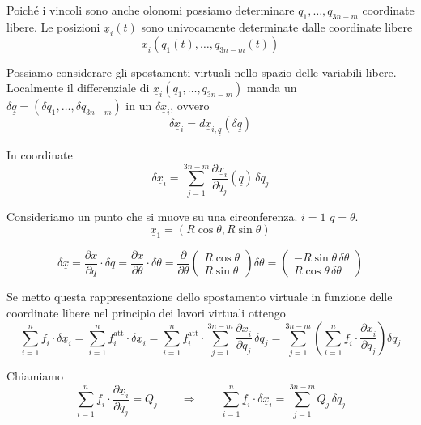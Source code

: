 Poiché i vincoli sono anche olonomi possiamo determinare \(q_1,\ldots,q_{3n-m}\) coordinate libere.
Le posizioni \(\underline{x}_i(t)\) sono univocamente determinate dalle coordinate libere
\[
\underline{x}_i(q_1(t),\ldots,q_{3n-m}(t))
\]

Possiamo considerare gli spostamenti virtuali nello spazio delle variabili libere.
Localmente il differenziale di \(\underline{x}_i(q_1,\ldots,q_{3n-m})\) manda un \(\delta \underline{q}=(\delta q_1,\ldots,\delta q_{3n-m})\) in un \(\delta \underline{x}_i\), ovvero
\[
\delta \underline{x}_i=d\underline{x}_{i,\underline{q}}(\delta \underline{q})
\]

In coordinate
\[
\delta \underline{x}_i=\sum_{j=1}^{3n-m}\frac{\partial \underline{x}_i}{\partial q_j}(\underline{q})\,\delta q_j
\]

\begin{example}{}
Consideriamo un punto che si muove su una circonferenza. \(i=1\) \(q=\theta\).
\[
\underline{x}_1=(R\cos\theta,R\sin\theta)
\]

\[
\delta \underline{x}=\frac{\partial \underline{x}}{\partial q}\cdot \delta q
=\frac{\partial \underline{x}}{\partial \theta}\cdot \delta \theta
=\frac{\partial}{\partial \theta}
\begin{pmatrix}
R\cos\theta\\
R\sin\theta
\end{pmatrix}
\delta \theta
=
\begin{pmatrix}
-R\sin\theta\,\delta \theta\\
R\cos\theta\,\delta \theta
\end{pmatrix}
\]
\end{example}

Se metto questa rappresentazione dello spostamento virtuale in funzione delle coordinate libere nel principio dei lavori virtuali ottengo
\[
\sum_{i=1}^{n}\underline{f}_i\cdot \delta \underline{x}_i
=
\sum_{i=1}^{n}\underline{f}_i^{\mathrm{att}}\cdot \delta \underline{x}_i
=
\sum_{i=1}^{n}\underline{f}_i^{\mathrm{att}}\cdot \sum_{j=1}^{3n-m}\frac{\partial \underline{x}_i}{\partial q_j}\,\delta q_j
=
\sum_{j=1}^{3n-m}\left(\sum_{i=1}^{n}\underline{f}_i\cdot \frac{\partial \underline{x}_i}{\partial q_j}\right)\delta q_j
\]

Chiamiamo
\[
\sum_{i=1}^{n}\underline{f}_i\cdot \frac{\partial \underline{x}_i}{\partial q_j}=Q_j
\qquad \Rightarrow \qquad
\sum_{i=1}^{n}\underline{f}_i\cdot \delta \underline{x}_i
=
\sum_{j=1}^{3n-m}Q_j\,\delta q_j
\]

